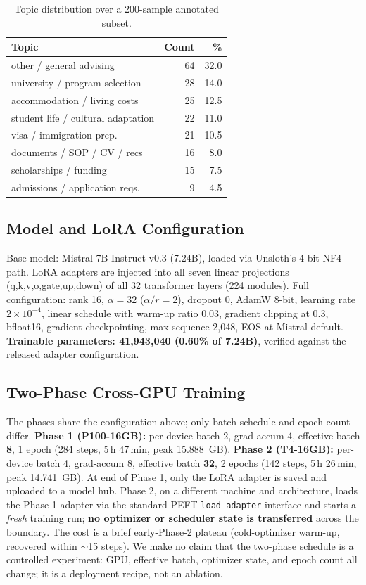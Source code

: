 \documentclass[11pt]{article}
\begin{document}
\begin{table}[t]\centering
\caption{Topic distribution over a 200-sample annotated subset.}\label{tab:topic}
\begin{tabular}{lrr}
\hline\textbf{Topic} & \textbf{Count} & \textbf{\%} \\
\hline
other / general advising & 64 & 32.0 \\
university / program selection & 28 & 14.0 \\
accommodation / living costs & 25 & 12.5 \\
student life / cultural adaptation & 22 & 11.0 \\
visa / immigration prep. & 21 & 10.5 \\
documents / SOP / CV / recs & 16 & 8.0 \\
scholarships / funding & 15 & 7.5 \\
admissions / application reqs. & 9 & 4.5 \\
\hline
\end{tabular}
\end{table}

\subsection{Model and LoRA Configuration}
Base model: Mistral-7B-Instruct-v0.3 (7.24B), loaded via Unsloth's 4-bit NF4 path. LoRA adapters are injected into all seven linear projections (q,k,v,o,gate,up,down) of all 32 transformer layers (224 modules). Full configuration: rank 16, $\alpha=32$ ($\alpha/r=2$), dropout 0, AdamW 8-bit, learning rate $2{\times}10^{-4}$, linear schedule with warm-up ratio 0.03, gradient clipping at 0.3, bfloat16, gradient checkpointing, max sequence 2{,}048, EOS at Mistral default. \textbf{Trainable parameters: 41{,}943{,}040 (0.60\% of 7.24B)}, verified against the released adapter configuration.

\subsection{Two-Phase Cross-GPU Training}
The phases share the configuration above; only batch schedule and epoch count differ. \textbf{Phase 1 (P100-16GB):} per-device batch 2, grad-accum 4, effective batch \textbf{8}, 1 epoch (284 steps, 5\,h 47\,min, peak 15.888~GB). \textbf{Phase 2 (T4-16GB):} per-device batch 4, grad-accum 8, effective batch \textbf{32}, 2 epochs (142 steps, 5\,h 26\,min, peak 14.741~GB). At end of Phase 1, only the LoRA adapter is saved and uploaded to a model hub. Phase 2, on a different machine and architecture, loads the Phase-1 adapter via the standard PEFT \texttt{load\_adapter} interface and starts a \emph{fresh} training run; \textbf{no optimizer or scheduler state is transferred} across the boundary. The cost is a brief early-Phase-2 plateau (cold-optimizer warm-up, recovered within $\sim$15 steps). We make no claim that the two-phase schedule is a controlled experiment: GPU, effective batch, optimizer state, and epoch count all change; it is a deployment recipe, not an ablation.
\end{document}
